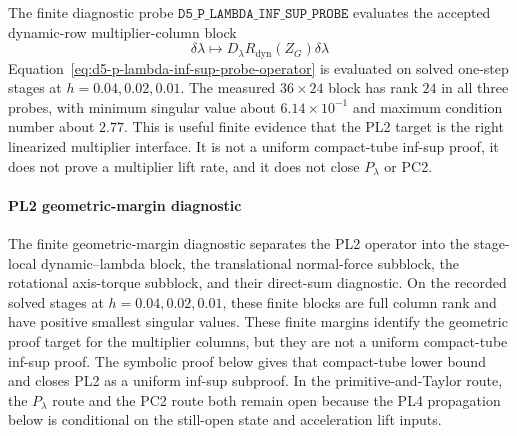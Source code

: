 \documentclass[preprint,12pt]{elsarticle}
\begin{document}
The finite diagnostic probe
\(\texttt{D5\_P\_LAMBDA\_INF\_SUP\_PROBE}\) evaluates the accepted
dynamic-row multiplier-column block
\begin{equation}
\label{eq:d5-p-lambda-inf-sup-probe-operator}
  \delta\lambda\mapsto D_{\lambda}R_{\mathrm{dyn}}(Z_G)\delta\lambda
\end{equation}
Equation~\eqref{eq:d5-p-lambda-inf-sup-probe-operator} is evaluated on solved one-step stages at \(h=0.04,0.02,0.01\).  The measured
\(36\times24\) block has rank \(24\) in all three probes, with minimum
singular value about \(6.14\times10^{-1}\) and maximum condition number about
\(2.77\).  This is useful finite evidence that the PL2 target is the right
linearized multiplier interface.  It is not a uniform compact-tube inf-sup
proof, it does not prove a multiplier lift rate, and it does not close
\(P_{\lambda}\) or PC2.

\paragraph{PL2 geometric-margin diagnostic}
The finite geometric-margin diagnostic separates the PL2 operator into the
stage-local dynamic--lambda block, the
translational normal-force subblock, the rotational axis-torque subblock, and
their direct-sum diagnostic.  On the recorded solved stages at
\(h=0.04,0.02,0.01\), these finite blocks are full column rank and have
positive smallest singular values.  These finite margins identify the
geometric proof target for the multiplier columns, but they are not a uniform
compact-tube inf-sup proof.  The symbolic proof below gives that compact-tube
lower bound and closes PL2 as a uniform inf-sup subproof.  In the
primitive-and-Taylor route, the \(P_{\lambda}\) route and the PC2 route both
remain open because the PL4
propagation below is conditional on the still-open state and acceleration
lift inputs.
\end{document}
